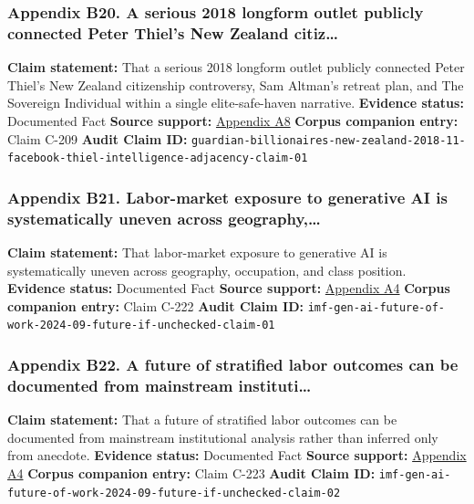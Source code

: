 \documentclass[
  american,
  11pt,
  letterpaper,
]{article}
\begin{document}
\subsubsection{Appendix B20. A serious 2018 longform outlet publicly
connected Peter Thiel's New Zealand
citiz\ldots{}}\label{appendix-b20-a-serious-2018-longform-outlet-publicly-connected-peter-thiel-s-new-zealand-citiz}

\textbf{Claim statement:} That a serious 2018 longform outlet publicly
connected Peter Thiel's New Zealand citizenship controversy, Sam
Altman's retreat plan, and The Sovereign Individual within a single
elite-safe-haven narrative. \textbf{Evidence status:} Documented Fact
\textbf{Source support:}
\hyperref[appendix-a8-why-silicon-valley-billionaires-are-prepping-for-the-apocalypse-in-new-zealand]{Appendix
A8} \textbf{Corpus companion entry:} Claim C-209 \textbf{Audit Claim
ID:}
\texttt{guardian-billionaires-new-zealand-2018-11-facebook-thiel-intelligence-adjacency-claim-01}

\subsubsection{Appendix B21. Labor-market exposure to generative AI is
systematically uneven across
geography,\ldots{}}\label{appendix-b21-labor-market-exposure-to-generative-ai-is-systematically-uneven-across-geography}

\textbf{Claim statement:} That labor-market exposure to generative AI is
systematically uneven across geography, occupation, and class position.
\textbf{Evidence status:} Documented Fact \textbf{Source support:}
\hyperref[appendix-a4-gen-ai-artificial-intelligence-and-the-future-of-work]{Appendix
A4} \textbf{Corpus companion entry:} Claim C-222 \textbf{Audit Claim
ID:}
\texttt{imf-gen-ai-future-of-work-2024-09-future-if-unchecked-claim-01}

\subsubsection{Appendix B22. A future of stratified labor outcomes can
be documented from mainstream
instituti\ldots{}}\label{appendix-b22-a-future-of-stratified-labor-outcomes-can-be-documented-from-mainstream-instituti}

\textbf{Claim statement:} That a future of stratified labor outcomes can
be documented from mainstream institutional analysis rather than
inferred only from anecdote. \textbf{Evidence status:} Documented Fact
\textbf{Source support:}
\hyperref[appendix-a4-gen-ai-artificial-intelligence-and-the-future-of-work]{Appendix
A4} \textbf{Corpus companion entry:} Claim C-223 \textbf{Audit Claim
ID:}
\texttt{imf-gen-ai-future-of-work-2024-09-future-if-unchecked-claim-02}
\end{document}

